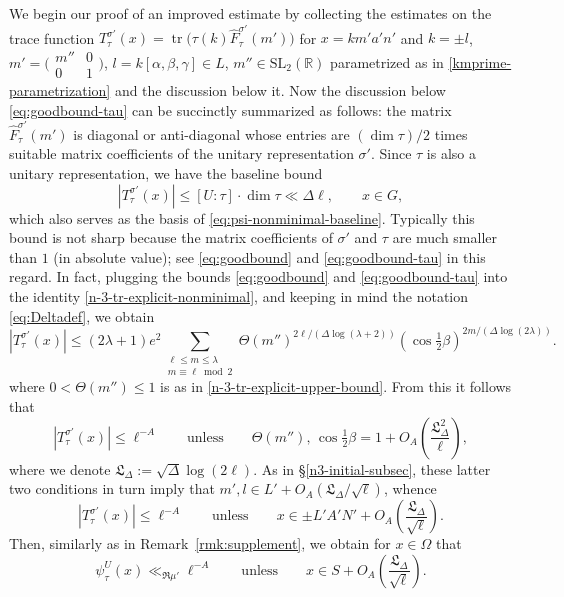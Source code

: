 \documentclass[11pt,oneside]{amsart}
\numberwithin{equation}{section}
\theoremstyle{remark}
\theoremstyle{plain}
\DeclareMathOperator{\tr}{tr}
\newcommand\SL{\mathrm{SL}}
\newcommand\RR{\mathbb{R}}
\renewcommand\leq{\leqslant}
\begin{document}
We begin our proof of an improved estimate by collecting the estimates on the trace function $T_{\tau}^{\sigma'}(x)=\tr\bigl(\tau(k)\hat{F}_{\tau}^{\sigma'}(m')\bigr)$ for $x=km'a'n'$ and $k=\pm l$, $m'=\big(\begin{smallmatrix}m''&0\\0&1\end{smallmatrix}\big)$, $l=k[\alpha,\beta,\gamma]\in L$, $m''\in \SL_2(\RR)$ parametrized as in \eqref{kmprime-parametrization} and the discussion below it. Now the discussion below \eqref{eq:goodbound-tau} can be succinctly summarized as follows: the matrix $\hat{F}_{\tau}^{\sigma'}(m')$ is diagonal or anti-diagonal whose entries are $(\dim\tau)/2$ times suitable matrix coefficients of the unitary representation $\sigma'$. Since $\tau$ is also a unitary representation, we have the baseline bound
\begin{equation}
\label{baseline-nonminimal-eq}
|T_{\tau}^{\sigma'}(x)|\leq [U:\tau] \cdot \dim \tau \ll \Delta \ell,\qquad x\in G,
\end{equation}
which also serves as the basis of \eqref{eq:psi-nonminimal-baseline}. Typically this bound is not sharp because the matrix coefficients of $\sigma'$ and $\tau$ are much smaller than $1$ (in absolute value); see \eqref{eq:goodbound} and \eqref{eq:goodbound-tau} in this regard. In fact, plugging the bounds \eqref{eq:goodbound} and \eqref{eq:goodbound-tau} into the identity \eqref{n-3-tr-explicit-nonminimal}, and keeping in mind the notation \eqref{eq:Deltadef}, we obtain
\[
|T_{\tau}^{\sigma'}(x)| \leq(2\lambda+1) e^2\sum_{\substack{\ell\leq m\leq\lambda\\m\equiv\ell\bmod 2}}\Theta(m'')^{2\ell/(\Delta\log(\lambda+2))}(\cos\tfrac12\beta)^{2m/(\Delta\log(2\lambda))}.
\]
where $0<\Theta(m'')\leq 1$ is as in \eqref{n-3-tr-explicit-upper-bound}. From this it follows that
\[ |T_{\tau}^{\sigma'}(x)|\leq\ell^{-A}\qquad\text{unless}\qquad \Theta(m''),\,\cos\tfrac12\beta=1+O_{A}\left(\frac{\mathfrak{L}_{\Delta}^2}{\ell}\right), \]
where we denote $\mathfrak{L}_{\Delta}:=\sqrt{\Delta} \log (2\ell)$. As in \S\ref{n3-initial-subsec}, these latter two conditions in turn imply that $m',l\in L'+O_A(\mathfrak{L}_{\Delta}/\sqrt{\ell})$, whence
\[ |T_{\tau}^{\sigma'}(x)|\leq \ell^{-A}\qquad\text{unless}\qquad x\in \pm L'A'N'+O_A\left(\frac{\mathfrak{L}_{\Delta}}{\sqrt{\ell}}\right). \]
Then, similarly as in Remark~\ref{rmk:supplement}, we obtain for $x\in \Omega$ that
\begin{equation}\label{eq:psi-essential-support-nonminimal}
\psi_{\tau}^{U}(x) \ll_{\Re\mu'} \ell^{-A} \qquad \text{unless} \qquad x\in S+O_A\left( \frac{\mathfrak{L}_{\Delta}}{\sqrt{\ell}}\right).
\end{equation}
\end{document}
